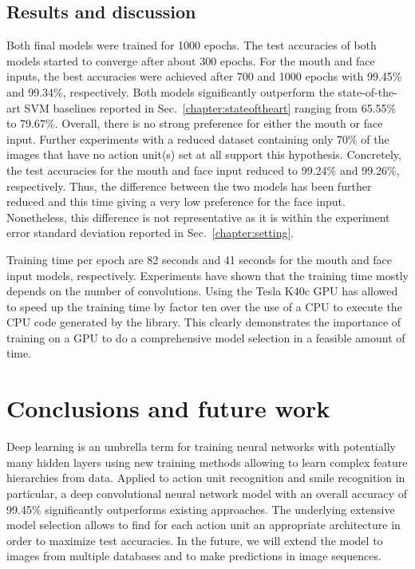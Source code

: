 \documentclass{ws-procs9x6}
\begin{document}
\subsection{Results and discussion}
Both final models were trained for 1000 epochs. The test accuracies of both models started to converge after about 300 epochs. For the mouth and face inputs, the best accuracies were achieved after 700 and 1000 epochs with 99.45\% and 99.34\%, respectively. Both models significantly outperform the state-of-the-art SVM baselines reported in Sec.~\ref{chapter:stateoftheart} ranging from 65.55\% to 79.67\%.
Overall, there is no strong preference for either the mouth or face input. Further experiments with a reduced dataset containing only 70\% of the images that have no action unit(s) set at all support this hypothesis. Concretely, the test accuracies for the mouth and face input reduced to 99.24\% and 99.26\%, respectively. Thus, the difference between the two models has been further reduced and this time giving a very low preference for the face input. Nonetheless, this difference is not representative as it is within the experiment error standard deviation reported in Sec.~\ref{chapter:setting}.

Training time per epoch are 82 seconds and 41 seconds for the mouth and face input models, respectively. Experiments have shown that the training time mostly depends on the number of convolutions. Using the Tesla K40c GPU has allowed to speed up the training time by factor ten over the use of a CPU to execute the CPU code generated by the library. This clearly demonstrates the importance of training on a GPU to do a comprehensive model selection in a feasible amount of time.

\section{Conclusions and future work}
Deep learning is an umbrella term for training neural networks with potentially many hidden layers using new training methods allowing to learn complex feature hierarchies from data. Applied to action unit recognition and smile recognition in particular, a deep convolutional neural network model with an overall accuracy of 99.45\% significantly outperforms existing approaches.
The underlying extensive model selection allows to find for each action unit an appropriate architecture in order to maximize test accuracies.
In the future, we will extend the model to images from multiple databases and to make predictions in image sequences. 
\end{document}
